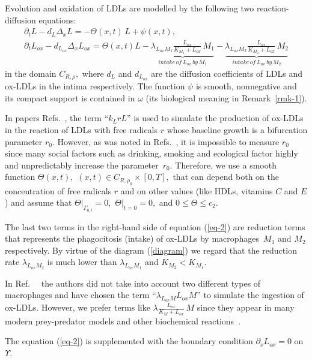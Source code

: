 \documentclass[reqno]{amsart}            %
\numberwithin{equation}{section}
\begin{document}
Evolution and oxidation of LDLs are modelled by the following two reaction-diffusion equations:
\begin{gather}
\partial_t L - d_L \Delta_x L= - \Theta(x, t) \, L + \psi(x, t),\label{eq-1}
\\[2mm]
\partial_t L_{ox} - d_{L_{ox}} \Delta_x L_{ox}=  \Theta(x, t) L   -  \underbrace{\lambda_{L_{ox}M_1} \frac{L_{ox}}{K_{M_1} + L_{ox}}\, M_1}_{intake \, of \, L_{ox}\, by \, M_1}
-  \underbrace{\lambda_{L_{ox}M_2} \frac{L_{ox}}{K_{M_2} + L_{ox}}\, M_2}_{intake \, of \, L_{ox}\, by \, M_2} \label{eq-2}
\end{gather}
in the domain $C_{R,\rho},$ where $d_L$ and $d_{L_{ox}}$ are the diffusion coefficients of
LDLs and ox-LDLs in the intima respectively. The function $\psi$ is smooth, nonnegative and  its compact support is contained in $\omega$
(its biological meaning in Remark~\ref{rmk-1}).

In papers Refs.~\cite{HaoFried-14,CobSheMax}, the term ``$k_L r L$'' is used to simulate  the production of ox-LDLs
in the reaction of LDLs with free radicals $r$ whose baseline growth is a bifurcation parameter $r_0.$ However, as was noted in Refs.~\cite{CobSheMax}, it is impossible to measure $r_0$ since many social factors such as drinking, smoking and ecological factor
highly and unpredictably increase the parameter~$r_0.$ Therefore, we use a smooth function $\Theta(x, t),$ $(x, t)\in C_{R,\rho_0}\times [0, T],$ that can depend both on the concentration of free radicals $r$  and on other values (like HDLs, vitamins $C$ and $E$) and assume that
$\Theta|_{\Gamma_{0,l}}=0,$ $\Theta|_{t=0}=0,$ and $0\le \Theta \le c_2.$

The last two terms in the right-hand side of equation (\ref{eq-2}) are  reduction terms that represents the phagocitosis (intake) of  ox-LDLs by macrophages~$M_1$ and $M_2$ respectively. By virtue of the diagram (\ref{diagram}) we regard that the reduction rate  $\lambda_{L_{ox}M_2}$
 is much lower than $\lambda_{L_{ox}M_1}$ and  $K_{M_2} < K_{M_1}.$

In Ref.~\cite{HaoFried-14} \  the authors did not take into account two different types of macrophages
and have chosen  the term ``$\lambda_{L_{ox} M} L_{ox} M$'' to simulate the ingestion of  ox-LDLs.
However, we prefer terms like   $\lambda \frac{L_{ox}}{K_M + L_{ox}}\, M$ since they appear  in many modern prey-predator models and other biochemical reactions~\cite{Perthame}.

The equation (\ref{eq-2}) is supplemented with  the boundary condition $\partial_{\nu} L_{ox} = 0$ on~$\Upsilon$.
\end{document}
